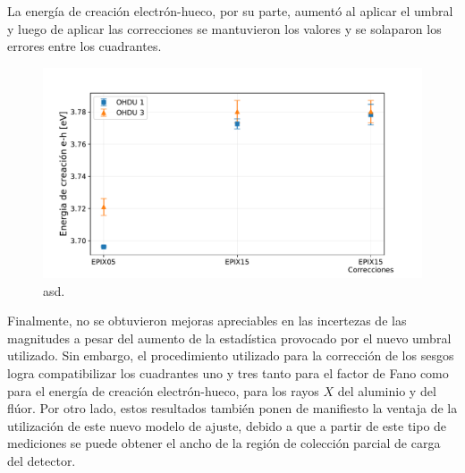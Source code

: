 La energía de creación electrón-hueco, por su parte, aumentó al aplicar el umbral y luego de aplicar las correcciones se mantuvieron los valores y se solaparon los errores entre los cuadrantes.
\begin{figure}[h]
    \centering
        \includegraphics[scale=0.5]{Figs/F_energia_creacion_eh.pdf}
    \caption{\footnotesize{asd.}}
    \label{fig:F_energia_creacion_eh}
\end{figure}
Finalmente, no se obtuvieron mejoras apreciables en las incertezas de las magnitudes a pesar del aumento de la estadística provocado por el nuevo umbral utilizado. Sin embargo, el procedimiento utilizado para la corrección de los sesgos logra compatibilizar los cuadrantes uno y tres tanto para el factor de Fano como para el energía de creación electrón-hueco, para los rayos $X$ del aluminio y del flúor. Por otro lado, estos resultados también ponen de manifiesto la ventaja de la utilización de este nuevo modelo de ajuste, debido a que a partir de este tipo de mediciones se puede obtener el ancho de la región de colección parcial de carga del detector.
